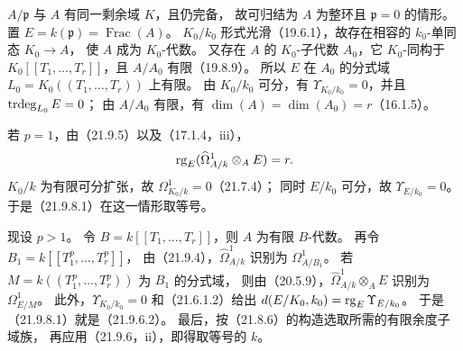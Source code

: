 \eproof
$A/\mathfrak p$ 与 $A$ 有同一剩余域 $K$，且仍完备，
故可归结为 $A$ 为整环且 $\mathfrak p=0$ 的情形。
置 $E=k(\mathfrak p)=\operatorname{Frac}(A)$。
$K_0/k_0$ 形式光滑（19.6.1），故存在相容的 $k_0$-单同态 $K_0\to A$，
使 $A$ 成为 $K_0$-代数。
又存在 $A$ 的 $K_0$-子代数 $A_0$，它 $K_0$-同构于
$K_0[[T_1,\ldots,T_r]]$，且 $A/A_0$ 有限（19.8.9）。
所以 $E$ 在 $A_0$ 的分式域 $L_0=K_0((T_1,\ldots,T_r))$ 上有限。
由 $K_0/k_0$ 可分，有 $\Upsilon_{K_0/k_0}=0$，并且 $\operatorname{trdeg}_{L_0}E=0$；
由 $A/A_0$ 有限，有 $\dim(A)=\dim(A_0)=r$（16.1.5）。

若 $p=1$，由（21.9.5）以及（17.1.4，iii），
\[
 \operatorname{rg}_E(\widehat\Omega^1_{A/k}\otimes_AE)=r.
\]
$K_0/k$ 为有限可分扩张，故 $\Omega^1_{K_0/k}=0$（21.7.4）；
同时 $E/k_0$ 可分，故 $\Upsilon_{E/k_0}=0$。
于是（21.9.8.1）在这一情形取等号。

现设 $p>1$。
令 $B=k[[T_1,\ldots,T_r]]$，则 $A$ 为有限 $B$-代数。
再令 $B_1=k[[T_1^p,\ldots,T_r^p]]$，
由（21.9.4），$\widehat\Omega^1_{A/k}$ 识别为 $\Omega^1_{A/B_1}$。
若 $M=k((T_1^p,\ldots,T_r^p))$ 为 $B_1$ 的分式域，
则由（20.5.9），$\widehat\Omega^1_{A/k}\otimes_AE$ 识别为 $\Omega^1_{E/M}$。
此外，$\Upsilon_{K_0/k_0}=0$ 和（21.6.1.2）给出
$d(E/K_0,k_0)=\operatorname{rg}_E\Upsilon_{E/k_0}$。
于是（21.9.8.1）就是（21.9.6.2）。
最后，按（21.8.6）的构造选取所需的有限余度子域族，
再应用（21.9.6，ii），即得取等号的 $k$。
\finishproof
